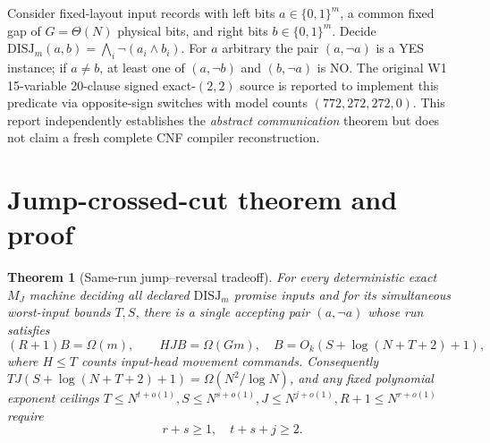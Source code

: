\documentclass[11pt]{article}
\newtheorem{theorem}{Theorem}
\begin{document}
Consider fixed-layout input records with left bits $a\in\{0,1\}^m$,
a common fixed gap of $G=\Theta(N)$ physical bits,
and right bits $b\in\{0,1\}^m$. Decide
$\mathrm{DISJ}_m(a,b)=\bigwedge_i\neg(a_i\wedge b_i)$.
For $a$ arbitrary the pair $(a,\neg a)$ is a YES instance;
if $a\ne b$, at least one of $(a,\neg b)$ and $(b,\neg a)$ is NO.
The original W1 15-variable 20-clause signed exact-$(2,2)$ source
is reported to implement this predicate via opposite-sign switches
with model counts $(772,272,272,0)$. This report independently establishes
the \emph{abstract communication} theorem but does not claim a fresh
complete CNF compiler reconstruction.

\section{Jump-crossed-cut theorem and proof}
\begin{theorem}[Same-run jump--reversal tradeoff]
For every deterministic exact $M_J$ machine deciding all declared
$\mathrm{DISJ}_m$ promise inputs and for its simultaneous worst-input bounds
$T,S$, there is a single accepting pair $(a,\neg a)$ whose run satisfies
\[
 (R+1)B=\Omega(m),\qquad HJB=\Omega(Gm),\quad
 B=O_k(S+\log(N+T+2)+1),
\]
where $H\le T$ counts input-head movement commands.
Consequently
$TJ(S+\log(N+T+2)+1)=\Omega(N^2/\log N)$,
and any fixed polynomial exponent ceilings
$T\le N^{t+o(1)},S\le N^{s+o(1)},
J\le N^{j+o(1)},R+1\le N^{r+o(1)}$ require
\[
 \boxed{r+s\ge1,\quad t+s+j\ge2}.
\]
\end{theorem}
\end{document}
